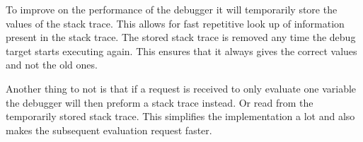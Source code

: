 To improve on the performance of the debugger it will temporarily store the values of the stack trace.
This allows for fast repetitive look up of information present in the stack trace.
The stored stack trace is removed any time the debug target starts executing again.
This ensures that it always gives the correct values and not the old ones.


Another thing to not is that if a request is received to only evaluate one variable the debugger will then preform a stack trace instead.
Or read from the temporarily stored stack trace.
This simplifies the implementation a lot and also makes the subsequent evaluation request faster.

